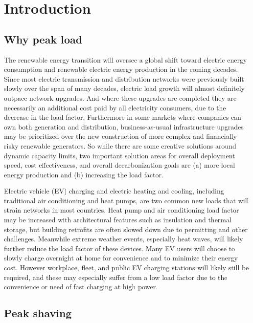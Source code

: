 \documentclass[journal,article,submit,pdftex,moreauthors]{Definitions/mdpi}
\begin{document}
\section{Introduction}\label{introduction}

\subsection{Why peak load}\label{why-peak-load}

The renewable energy transition will oversee a global shift toward
electric energy consumption and renewable electric energy production in
the coming decades. Since most electric transmission and distribution
networks were previously built slowly over the span of many decades,
electric load growth will almost definitely outpace network upgrades.
And where these upgrades are completed they are necessarily an
additional cost paid by all electricity consumers, due to the decrease
in the load factor. Furthermore in some markets where companies can own
both generation and distribution, business-as-usual infrastructure
upgrades may be prioritized over the new construction of more complex
and financially risky renewable generators. So while there are some
creative solutions around dynamic capacity limits, two important
solution areas for overall deployment speed, cost effectiveness, and
overall decarbonization goals are (a) more local energy production and
(b) increasing the load factor.

Electric vehicle (EV) charging and electric heating and cooling,
including traditional air conditioning and heat pumps, are two common
new loads that will strain networks in most countries. Heat pump and air
conditioning load factor may be increased with architectural features
such as insulation and thermal storage, but building retrofits are often
slowed down due to permitting and other challenges. Meanwhile extreme
weather events, especially heat waves, will likely further reduce the
load factor of these devices. Many EV users will choose to slowly charge
overnight at home for convenience and to minimize their energy cost.
However workplace, fleet, and public EV charging stations will likely
still be required, and these may especially suffer from a low load
factor due to the convenience or need of fast charging at high power.

\subsection{Peak shaving}\label{peak-shaving}%
\end{document}
